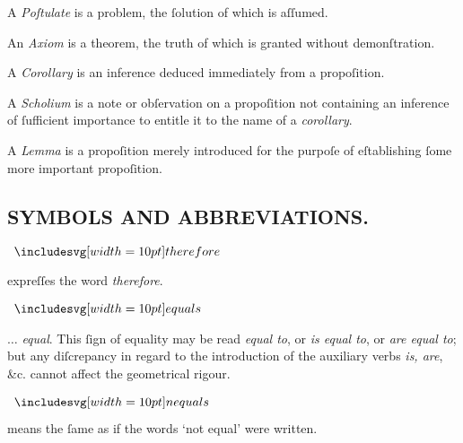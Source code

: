 A \textit{Poſtulate} is a problem, the ſolution of which is aſſumed.

An \textit{Axiom} is a theorem, the truth of which is granted without demonſtration.

A \textit{Corollary} is an inference deduced immediately from a propoſition.

A \textit{Scholium} is a note or obſervation on a propoſition not containing an inference of ſufficient importance to entitle it to the name of a \textit{corollary}.

A \textit{Lemma} is a propoſition merely introduced for the purpoſe of eſtablishing ſome more important propoſition.

\pagebreak

\subsection[Symbols and Abbreviations]{\centering \scshape{\LARGE{SYMBOLS AND ABBREVIATIONS.}}}
\label{subsec:symbolsandabbreviations}

\begin{minipage}[t]{0.20\textwidth}
    \begin{center}
        $\btherefore$
    \end{center}
\end{minipage}%
\begin{minipage}[t]{0.80\textwidth}
    expreſſes the word \textit{therefore}.
\end{minipage}

\begin{minipage}[t]{0.20\textwidth}
    \begin{center}
        $\bequals$
    \end{center}
\end{minipage}%
\begin{minipage}[t]{0.80\textwidth}
    $\ldots$ \textit{equal}. This ſign of equality may be read \textit{equal to}, or \textit{is equal to}, or \textit{are equal to}; but any diſcrepancy in regard to the introduction of the auxiliary verbs \textit{is, are}, \&c. cannot affect the geometrical rigour.
\end{minipage}

\begin{minipage}[t]{0.20\textwidth}
    \begin{center}
        $\bnequals$
    \end{center}
\end{minipage}%
\begin{minipage}[t]{0.80\textwidth}
    means the ſame as if the words ‘not equal’ were written.
\end{minipage}

